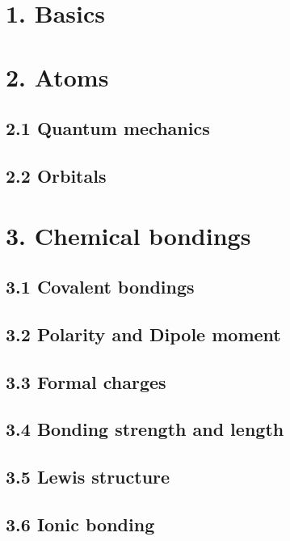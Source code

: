 \documentclass{cheatsheet}
\author{Noa Sendlhofer \& Christian Leser \\ nsendlhofer \& cleser}
\begin{document}
\section{1. Basics} %
	

\section{2. Atoms} %
	\subsection{2.1 Quantum mechanics}
	
	\subsection{2.2 Orbitals}
	

\section{3. Chemical bondings} %
	\subsection{3.1 Covalent bondings}
	
	\subsection{3.2 Polarity and Dipole moment}
	
	\subsection{3.3 Formal charges}
	
	\subsection{3.4 Bonding strength and length}
	
	\subsection{3.5 Lewis structure}
	
	\subsection{3.6 Ionic bonding}
	
\end{document}
